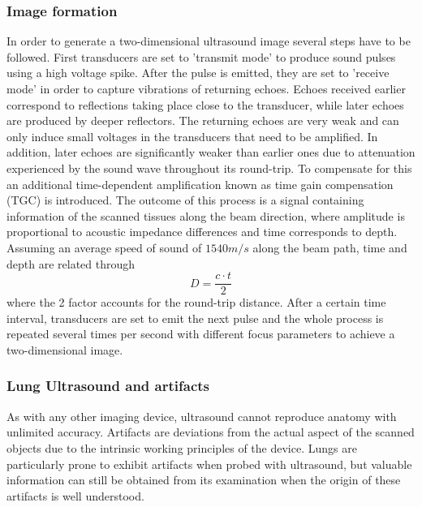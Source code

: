 \documentclass[11pt]{article} %
\begin{document}
\subsubsection{Image formation}
	
	In order to generate a two-dimensional ultrasound image several steps have to be followed. First transducers are set to 'transmit mode' to produce sound pulses using a high voltage spike. After the pulse is emitted, they are set to 'receive mode' in order to capture vibrations of returning echoes. Echoes received earlier correspond to reflections taking place close to the transducer, while later echoes are produced by deeper reflectors.  The returning echoes are very weak and can only induce small voltages in the transducers that need to be amplified. In addition, later echoes are significantly weaker than earlier ones due to attenuation experienced by the sound wave throughout its round-trip. To compensate for this an additional time-dependent amplification known as time gain compensation (TGC) is introduced. The outcome of this process is a signal containing information of the scanned tissues along the beam direction, where amplitude is proportional to acoustic impedance differences and time corresponds to depth. Assuming an average speed of sound of $1540 m/s$ along the beam path, time and depth are related through \[ D = \frac{c·t}{2} \] where the 2 factor accounts for the round-trip distance. After a certain time interval, transducers are set to emit the next pulse and the whole process is repeated several times per second with different focus parameters to achieve a two-dimensional image. 

\subsubsection{Lung Ultrasound and artifacts}


	As with any other imaging device, ultrasound cannot reproduce anatomy with unlimited accuracy. Artifacts are deviations from the actual aspect of the scanned objects due to the intrinsic working principles of the device. Lungs are particularly prone to exhibit artifacts when probed with ultrasound, but valuable information can still be obtained from its examination when the origin of these artifacts is well understood. 
	
\end{document}
